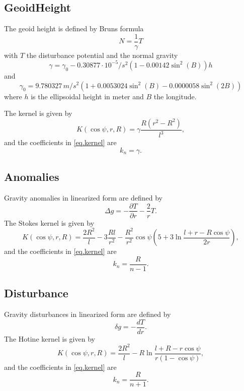 \subsection{GeoidHeight}\label{kernelType:geoidHeight}
The geoid height is defined by Bruns formula
\begin{equation}
N = \frac{1}{\gamma}T
\end{equation}
with $T$ the disturbance potential and the normal gravity
\begin{equation}\label{normalgravity}
\gamma  = \gamma_0 - 0.30877\cdot 10^{-5}/s^2(1-0.00142\sin^2(B))h
\end{equation}
and
\begin{equation}
\gamma_0 = 9.780327\,m/s^2(1+0.0053024\sin^2(B)-0.0000058\sin^2(2B))
\end{equation}
where $h$ is the ellipsoidal height in meter and $B$ the longitude.

The kernel is given by
\begin{equation}
K(\cos\psi,r,R) = \gamma\frac{R(r^2-R^2)}{l^3},
\end{equation}
and the coefficients in \eqref{eq.kernel} are
\begin{equation}
k_n = \gamma.
\end{equation}


\subsection{Anomalies}
Gravity anomalies in linearized form are defined by
\begin{equation}
\Delta g = -\frac{\partial T}{\partial r}-\frac{2}{r}T.
\end{equation}
The Stokes kernel is given by
\begin{equation}
K(\cos\psi,r,R) = \frac{2R^2}{l}-3\frac{Rl}{r^2}-\frac{R^2}{r^2}\cos\psi
\left(5+3\ln\frac{l+r-R\cos\psi}{2r}\right),
\end{equation}
and the coefficients in \eqref{eq.kernel} are
\begin{equation}
k_n = \frac{R}{n-1}.
\end{equation}


\subsection{Disturbance}\label{kernelType:disturbance}
Gravity disturbances in linearized form are defined by
\begin{equation}
\delta g = -\frac{dT}{dr}.
\end{equation}
The Hotine kernel is given by
\begin{equation}
K(\cos\psi,r,R) = \frac{2R^2}{l}-R\ln\frac{l+R-r\cos\psi}{r(1-\cos\psi)},
\end{equation}
and the coefficients in \eqref{eq.kernel} are
\begin{equation}
k_n = \frac{R}{n+1}.
\end{equation}


